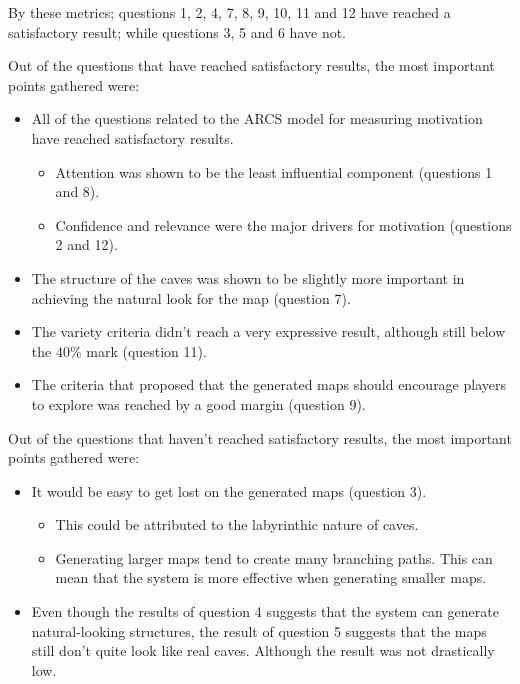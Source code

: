By these metrics; questions 1, 2, 4, 7, 8, 9, 10, 11 and 12 have reached a satisfactory result; while questions 3, 5 and 6 have not.

Out of the questions that have reached satisfactory results, the most important points gathered were:
\begin{itemize}
    \item All of the questions related to the ARCS model for measuring motivation have reached satisfactory results.
    \begin{itemize}
        \item Attention was shown to be the least influential component (questions 1 and 8).
        \item Confidence and relevance were the major drivers for motivation (questions 2 and 12).
    \end{itemize}
    \item The structure of the caves was shown to be slightly more important in achieving the natural look for the map (question 7).
    \item The variety criteria didn't reach a very expressive result, although still below the 40\% mark (question 11).
    \item The criteria that proposed that the generated maps should encourage players to explore was reached by a good margin (question 9).
\end{itemize}

Out of the questions that haven't reached satisfactory results, the most important points gathered were:
\begin{itemize}
    \item It would be easy to get lost on the generated maps (question 3).
    \begin{itemize}
        \item This could be attributed to the labyrinthic nature of caves.
        \item Generating larger maps tend to create many branching paths. This can mean that the system is more effective when generating smaller maps.
    \end{itemize}
    \item Even though the results of question 4 suggests that the system can generate natural-looking structures, the result of question 5 suggests that the maps still don't quite look like real caves. Although the result was not drastically low. 
\end{itemize}
